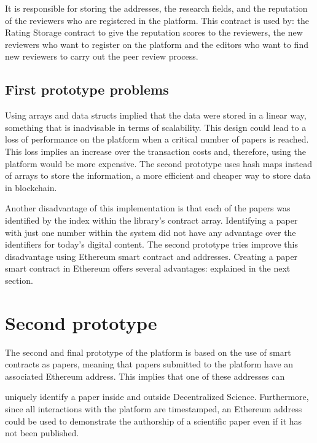 It is responsible for storing the addresses, the research fields, and the
reputation of the reviewers who are registered in the platform. This contract is
used by: the Rating Storage contract to give the reputation scores to the
reviewers, the new reviewers who want to register on the platform and the
editors who want to find new reviewers to carry out the peer review process.

\subsection*{First prototype problems}
\label{sec:first-prot-probl}

Using arrays and data structs implied that the data were stored in a linear way,
something that is inadvisable in terms of scalability. This design could lead to
a loss of performance on the platform when a critical number of papers is
reached. This loss implies an increase over the transaction costs and,
therefore, using the platform would be more expensive. The second prototype uses
hash maps instead of arrays to store the information, a more efficient and
cheaper way to store data in blockchain.

Another disadvantage of this implementation is that each of the papers was
identified by the index within the library's contract array. Identifying a paper
with just one number within the system did not have any advantage over the
identifiers for today's digital content. The second prototype tries improve this
disadvantage using Ethereum smart contract and addresses. Creating a paper smart
contract in Ethereum offers several advantages: explained in the next section.

\section{Second prototype}
\label{sec:second-prototype}

The second and final prototype of the platform is based on the use of smart
contracts as papers, meaning that papers submitted to the platform have an
associated Ethereum address. This implies that one of these addresses can

uniquely identify a paper inside and outside Decentralized Science. Furthermore,
since all interactions with the platform are timestamped, an Ethereum address
could be used to demonstrate the authorship of a scientific paper even if it has
not been published.


